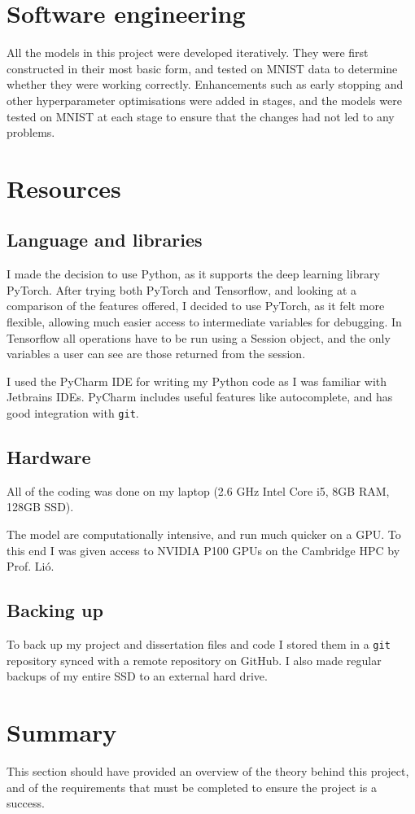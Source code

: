 \section{Software engineering}

All the models in this project were developed iteratively. They were first constructed in their most basic form, and tested on MNIST 
data to determine whether they were working correctly. Enhancements such as early stopping and other hyperparameter optimisations were 
added in stages, and the models were tested on MNIST at each stage to ensure that the changes had not led to any problems.

\section{Resources}

\subsection{Language and libraries}
I made the decision to use Python, as it supports the deep learning library PyTorch.  After trying both PyTorch and Tensorflow, 
and looking at a comparison of the features offered, I decided to 
use PyTorch, as it felt more flexible, allowing much easier access 
to intermediate variables for debugging. In Tensorflow all operations have to be run using a Session object, and the only variables a 
user can see are those returned from the session.

I used the PyCharm IDE for writing my Python code as I was familiar with Jetbrains IDEs.
PyCharm includes useful features like autocomplete, and has good integration with \texttt{git}.

\subsection{Hardware}
All of the coding was done on my laptop (2.6 GHz Intel Core i5, 8GB RAM, 128GB SSD).

The model are computationally intensive, and run much 
quicker on a GPU. To this end I was given access to NVIDIA P100 GPUs on the Cambridge HPC by Prof. Li\'o.

\subsection{Backing up}
To back up my project and dissertation files and code I stored them in a \texttt{git} repository synced with a remote repository on GitHub. I also 
made regular backups of my entire SSD to an external hard drive.

\section{Summary}
This section should have provided an overview of the theory behind this project, and of the requirements that must be completed to 
ensure the project is a success.